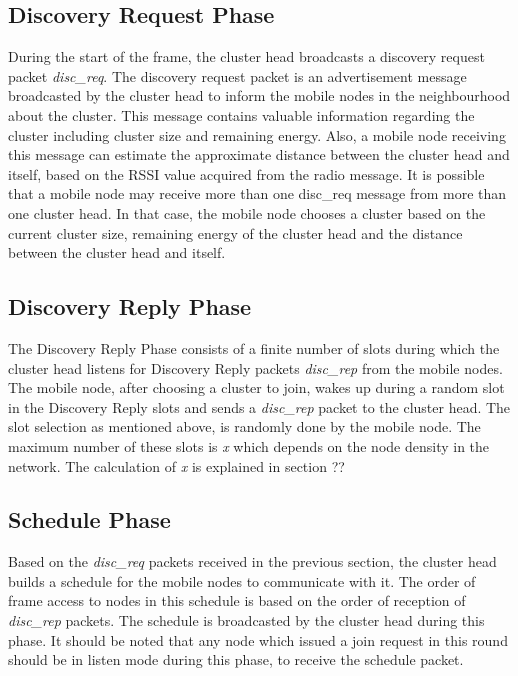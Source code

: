 \documentclass[a4paper, conference, 10pt]{IEEEtran}
\begin{document}
\subsection{Discovery Request Phase}
\label{disc_req_phase}
During the start of the frame, the cluster head broadcasts a discovery request packet \emph{disc\_req}. The discovery request packet is an advertisement message broadcasted by the cluster head to inform the mobile nodes in the neighbourhood about the cluster. This message contains valuable information regarding the cluster including cluster size and remaining energy. Also, a mobile node receiving this message can estimate the approximate distance between the cluster head and itself, based on the RSSI value acquired from the radio message. It is possible that a mobile node may receive more than one disc\_req message from more than one cluster head. In that case, the mobile node chooses a cluster based on the current cluster size, remaining energy of the cluster head and the distance between the cluster head and itself. 

\subsection{Discovery Reply Phase}
\label{disc_rep_phase}
The Discovery Reply Phase consists of a finite number of slots during which the cluster head listens for Discovery Reply packets \emph{disc\_rep} from the mobile nodes. The mobile node, after choosing a cluster to join, wakes up during a random slot in the Discovery Reply slots and sends a \emph{disc\_rep} packet to the cluster head. The slot selection as mentioned above, is randomly done by the mobile node. The maximum number of these slots is \emph{x} which depends on the node density in the network. The calculation of \emph{x} is explained in section ??

\subsection{Schedule Phase}
\label{sched_phase}
Based on the \emph{disc\_req} packets received in the previous section, the cluster head builds a schedule for the mobile nodes to communicate with it. The order of frame access to nodes in this schedule is based on the order of reception of \emph{disc\_rep} packets. The schedule is broadcasted by the cluster head during this phase. It should be noted that any node which issued a join request in this round should be in listen mode during this phase, to receive the schedule packet. 
\end{document}

